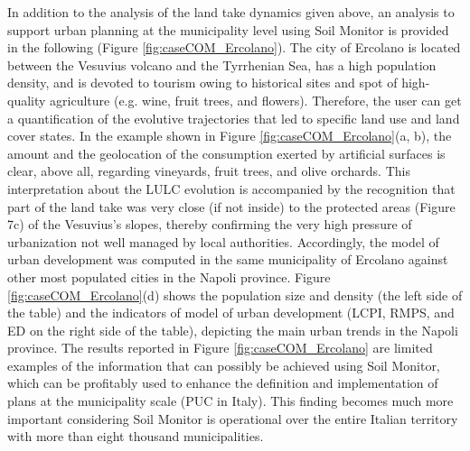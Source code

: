 \documentclass[APA,LATO1COL,doublespace]{WileyNJD-v2}
\begin{document}
In addition to the analysis of the land take dynamics given above, an analysis to support urban planning at the municipality level using Soil Monitor is provided in the following (Figure \ref{fig:caseCOM_Ercolano}).
The city of Ercolano is located between the Vesuvius volcano and the Tyrrhenian Sea, has a high population density, and is devoted to tourism owing to historical sites and spot of high-quality agriculture (e.g. wine, fruit trees, and flowers). 
Therefore, the user can get a quantification of the evolutive trajectories that led to specific land use and land cover states. 
In the example shown in Figure \ref{fig:caseCOM_Ercolano}(a, b), the amount and the geolocation of the consumption exerted by artificial surfaces is clear, above all, regarding vineyards, fruit trees, and olive orchards. 
This interpretation about the LULC evolution is accompanied by the recognition that part of the land take was very close (if not inside) to the protected areas (Figure 7c) of the Vesuvius's slopes, thereby confirming the very high pressure of urbanization not well managed by local authorities. 
Accordingly, the model of urban development was computed in the same municipality of Ercolano against other most populated cities in the Napoli province. 
Figure \ref{fig:caseCOM_Ercolano}(d) shows the population size and density (the left side of the table) and the indicators of model of urban development (LCPI, RMPS, and ED on the right side of the table), depicting the main urban trends in the Napoli province.
The results reported in Figure \ref{fig:caseCOM_Ercolano} are limited examples of the information that can possibly be achieved using Soil Monitor, which can be profitably used to enhance the definition and implementation of plans at the municipality scale (PUC in Italy).
This finding becomes much more important considering Soil Monitor is operational over the entire Italian territory with more than eight thousand municipalities.
\end{document}
